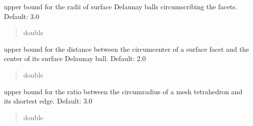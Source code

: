 \documentclass[letterpaper,10pt,english]{sphinxmanual}
\begin{document}
\begin{fulllineitems}
\begin{fulllineitems}
\begin{quote}
\begin{description}
\end{description}\end{quote}

\end{fulllineitems}


\begin{fulllineitems}
\label{\detokenize{_autosummary/nirfasterff.utils.MeshingParams:nirfasterff.utils.MeshingParams.facet_size}}
\pysigstartsignatures
\pysigline
{}
\pysigstopsignatures
\sphinxAtStartPar
upper bound for the radii of surface Delaunay balls circumscribing the facets. Default: 3.0
\begin{quote}\begin{description}
\sphinxAtStartPar
double

\end{description}\end{quote}

\end{fulllineitems}


\begin{fulllineitems}
\label{\detokenize{_autosummary/nirfasterff.utils.MeshingParams:nirfasterff.utils.MeshingParams.facet_distance}}
\pysigstartsignatures
\pysigline
{}
\pysigstopsignatures
\sphinxAtStartPar
upper bound for the distance between the circumcenter of a surface facet and the center of its surface Delaunay ball. Default: 2.0
\begin{quote}\begin{description}
\sphinxAtStartPar
double

\end{description}\end{quote}

\end{fulllineitems}


\begin{fulllineitems}
\label{\detokenize{_autosummary/nirfasterff.utils.MeshingParams:nirfasterff.utils.MeshingParams.cell_radius_edge}}
\pysigstartsignatures
\pysigline
{}
\pysigstopsignatures
\sphinxAtStartPar
upper bound for the ratio between the circumradius of a mesh tetrahedron and its shortest edge. Default: 3.0
\begin{quote}\begin{description}
\sphinxAtStartPar
double


\end{description}
\end{quote}
\end{fulllineitems}
\end{fulllineitems}
\end{document}
